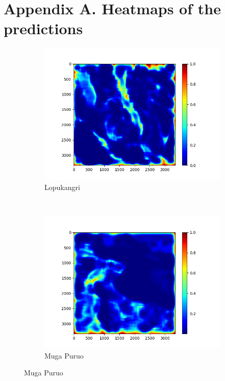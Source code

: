 \documentclass[11pt,a4paper]{article}
\begin{document}
\section{Appendix A. Heatmaps of the predictions}
\begin{figure}[t]
    \centering
    \begin{subfigure}[b]{0.45\textwidth}
        \includegraphics[width=\textwidth]{graphics/training/train_on_01_features_01234/heatmaps_faults_0.png}
        \caption{Lopukangri}
        \label{fig:heatmaps_2_Lopukangri}
    \end{subfigure}
    ~
    \begin{subfigure}[b]{0.45\textwidth}
        \includegraphics[width=\textwidth]{graphics/training/train_on_01_features_01234/heatmaps_faults_1.png}
        \caption{Muga Puruo}
        \label{fig:heatmaps_2_Muga_Puruo}
    \end{subfigure}


\end{figure}
\end{document}
